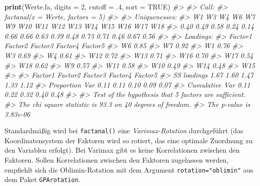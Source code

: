 \documentclass[12pt,ngerman,]{book}
\makeatletter
\newenvironment{Shaded}{\begin{snugshade}}{\end{snugshade}}
\newcommand{\KeywordTok}[1]{\textcolor[rgb]{0.13,0.29,0.53}{\textbf{{#1}}}}
\newcommand{\DataTypeTok}[1]{\textcolor[rgb]{0.13,0.29,0.53}{{#1}}}
\newcommand{\DecValTok}[1]{\textcolor[rgb]{0.00,0.00,0.81}{{#1}}}
\newcommand{\CommentTok}[1]{\textcolor[rgb]{0.56,0.35,0.01}{\textit{{#1}}}}
\newcommand{\OtherTok}[1]{\textcolor[rgb]{0.56,0.35,0.01}{{#1}}}
\newcommand{\NormalTok}[1]{{#1}}
\newenvironment{kframe}{%
\medskip{}
\setlength{\fboxsep}{.8em}
 \def\at@end@of@kframe{}%
 \ifinner\ifhmode%
  \def\at@end@of@kframe{\end{minipage}}%
  \begin{minipage}{\columnwidth}%
 \fi\fi%
 \def\FrameCommand##1{\hskip\@totalleftmargin \hskip-\fboxsep
 \colorbox{shadecolor}{##1}\hskip-\fboxsep
     \hskip-\linewidth \hskip-\@totalleftmargin \hskip\columnwidth}%
 \MakeFramed {\advance\hsize-\width
   \@totalleftmargin\z@ \linewidth\hsize
   \@setminipage}}%
 {\par\unskip\endMakeFramed%
 \at@end@of@kframe}
\renewenvironment{Shaded}{\begin{kframe}}{\end{kframe}}
\makeatother
\begin{document}
\begin{Shaded}
\begin{Highlighting}[]
\KeywordTok{print}\NormalTok{(Werte.fa, }\DataTypeTok{digits =} \DecValTok{2}\NormalTok{, }\DataTypeTok{cutoff =} \NormalTok{.}\DecValTok{4}\NormalTok{, }\DataTypeTok{sort =} \OtherTok{TRUE}\NormalTok{)}
\CommentTok{#> }
\CommentTok{#> Call:}
\CommentTok{#> factanal(x = Werte, factors = 5)}
\CommentTok{#> }
\CommentTok{#> Uniquenesses:}
\CommentTok{#>   W1   W3   W4   W6   W7   W9  W10  W11  W12  W13  W14  W15  W16  W17  W18 }
\CommentTok{#> 0.40 0.49 0.58 0.24 0.14 0.66 0.66 0.63 0.39 0.48 0.73 0.71 0.46 0.67 0.56 }
\CommentTok{#> }
\CommentTok{#> Loadings:}
\CommentTok{#>     Factor1 Factor2 Factor3 Factor4 Factor5}
\CommentTok{#> W6   0.85                                  }
\CommentTok{#> W7   0.92                                  }
\CommentTok{#> W1           0.76                          }
\CommentTok{#> W3           0.69                          }
\CommentTok{#> W4           0.61                          }
\CommentTok{#> W12                  0.72                  }
\CommentTok{#> W13                  0.71                  }
\CommentTok{#> W16                          0.70          }
\CommentTok{#> W17                          0.54          }
\CommentTok{#> W18                          0.62          }
\CommentTok{#> W9                                   0.57  }
\CommentTok{#> W11                                  0.58  }
\CommentTok{#> W10                                  0.49  }
\CommentTok{#> W14                  0.48                  }
\CommentTok{#> W15                                        }
\CommentTok{#> }
\CommentTok{#>                Factor1 Factor2 Factor3 Factor4 Factor5}
\CommentTok{#> SS loadings       1.67    1.60    1.47    1.33    1.12}
\CommentTok{#> Proportion Var    0.11    0.11    0.10    0.09    0.07}
\CommentTok{#> Cumulative Var    0.11    0.22    0.32    0.40    0.48}
\CommentTok{#> }
\CommentTok{#> Test of the hypothesis that 5 factors are sufficient.}
\CommentTok{#> The chi square statistic is 93.3 on 40 degrees of freedom.}
\CommentTok{#> The p-value is 3.83e-06}
\end{Highlighting}
\end{Shaded}

Standardmäßig wird bei \texttt{factanal()} eine \emph{Varimax-Rotation}
durchgeführt (das Koordinatensystem der Faktoren wird so rotiert, das
eine optimale Zuordnung zu den Variablen erfolgt). Bei Varimax gibt es
keine Korrelationen zwischen den Faktoren. Sollen Korrelationen zwischen
den Faktoren zugelassen werden, empfiehlt sich die Oblimin-Rotation mit
dem Argument \texttt{rotation="oblimin"} aus dem Paket
\texttt{GPArotation}.
\end{document}
